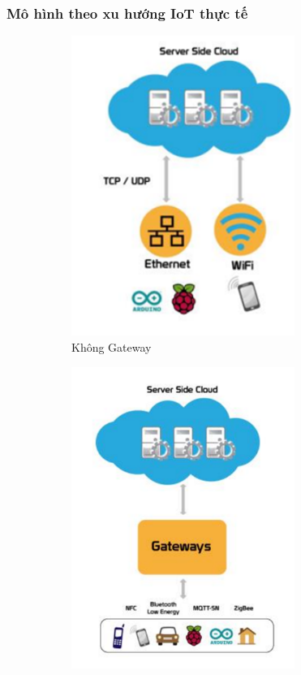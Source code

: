 \subsubsection*{Mô hình theo xu hướng IoT thực tế}
\begin{figure}[H]
	\centering  
	\begin{subfigure}[b]{0.5\textwidth}
		\includegraphics[width=0.8\textwidth]{pic5}
		\caption[Không Gateway]{Không Gateway}
		\label{fig:pic5}
	\end{subfigure}\hfill
	\begin{subfigure}[b]{0.5\textwidth}
		\includegraphics[width=0.8\textwidth]{pic6}

\end{subfigure}
\end{figure}

